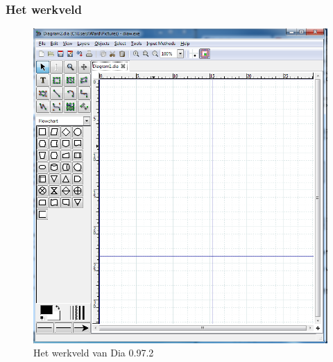 \documentclass[12pt,a4paper]{report}
\begin{document}
\begin{flushleft}
\subsubsection{Het werkveld}
\begin{figure}[H]
\includegraphics[scale=0.5]{images/werkveld_01.png}
\centering 
\vspace{-10pt}
\caption{Het werkveld van Dia 0.97.2}
\end{figure}

\end{flushleft}
\end{document}
